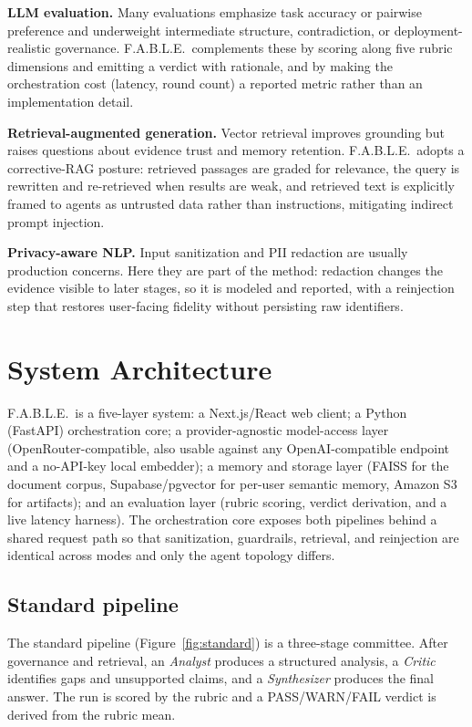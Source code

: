\documentclass{article}
\begin{document}
\textbf{LLM evaluation.} Many evaluations emphasize task accuracy or pairwise preference and
underweight intermediate structure, contradiction, or deployment-realistic governance.
F.A.B.L.E.\ complements these by scoring along five rubric dimensions and emitting a verdict
with rationale, and by making the orchestration cost (latency, round count) a reported metric
rather than an implementation detail.

\textbf{Retrieval-augmented generation.} Vector retrieval improves grounding but raises
questions about evidence trust and memory retention. F.A.B.L.E.\ adopts a corrective-RAG
posture: retrieved passages are graded for relevance, the query is rewritten and re-retrieved
when results are weak, and retrieved text is explicitly framed to agents as untrusted data
rather than instructions, mitigating indirect prompt injection.

\textbf{Privacy-aware NLP.} Input sanitization and PII redaction are usually production
concerns. Here they are part of the method: redaction changes the evidence visible to later
stages, so it is modeled and reported, with a reinjection step that restores user-facing
fidelity without persisting raw identifiers.

\section{System Architecture}
\label{sec:arch}
F.A.B.L.E.\ is a five-layer system: a Next.js/React web client; a Python (FastAPI)
orchestration core; a provider-agnostic model-access layer (OpenRouter-compatible, also
usable against any OpenAI-compatible endpoint and a no-API-key local embedder); a memory and
storage layer (FAISS for the document corpus, Supabase/pgvector for per-user semantic memory,
Amazon S3 for artifacts); and an evaluation layer (rubric scoring, verdict derivation, and a
live latency harness). The orchestration core exposes both pipelines behind a shared request
path so that sanitization, guardrails, retrieval, and reinjection are identical across modes
and only the agent topology differs.

\subsection{Standard pipeline}
\label{sec:standard}
The standard pipeline (Figure~\ref{fig:standard}) is a three-stage committee. After
governance and retrieval, an \emph{Analyst} produces a structured analysis, a \emph{Critic}
identifies gaps and unsupported claims, and a \emph{Synthesizer} produces the final answer.
The run is scored by the rubric and a PASS/WARN/FAIL verdict is derived from the rubric mean.
\end{document}
